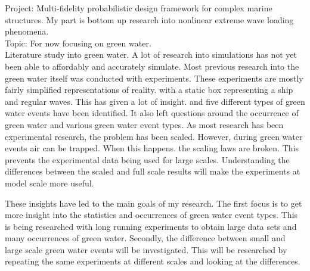 Project: Multi-fidelity probabilistic design framework for complex marine structures. My part is bottom up research into nonlinear extreme wave loading phenomena. \\

Topic: For now focusing on green water. \\


Literature study into green water. A lot of research into simulations has not yet been able to affordably and accurately simulate. Most previous research into the green water itself was conducted with experiments. These experiments are mostly fairly simplified representations of reality. with a static box representing a ship and regular waves. This has given a lot of insight. and five different types of green water events have been identified. It also left questions around the occurrence of green water and various green water event types. As most research has been experimental research, the problem has been scaled. However, during green water events air can be trapped. When this happens. the scaling laws are broken. This prevents the experimental data being used for large scales. Understanding the differences between the scaled and full scale results will make the experiments at model scale more useful.  \par 

These insights have led to the main goals of my research. The first focus is to get more insight into the statistics and occurrences of green water event types. This is being researched with long running experiments to obtain large data sets and many occurrences of green water. Secondly, the difference between small and large scale green water events will be investigated. This will be researched by repeating the same experiments at different scales and looking at the differences. 

